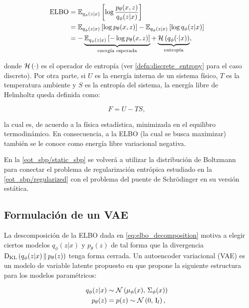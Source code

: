\begin{align*}
    \operatorname{ELBO} & = \mathbb{E}_{q_\phi(z|x)}\left[\log\frac{p_\theta(x,z)}{q_\phi(z|x)}\right]                                                                                   \\
          & = \mathbb{E}_{q_\phi(z|x)}\left[\log p_\theta(x,z)\right] - \mathbb{E}_{q_\phi(z|x)}\left[\log q_\phi(z|x)\right]                                                                  \\
          & = -\underbrace{\mathbb{E}_{q_\phi(z|x)}\left[-\log p_\theta(x,z)\right]}_{\text{energía esperada}} + \underbrace{\mathcal{H}\left(q_\phi(\cdot|x)\right)}_{\text{entropía}},
\end{align*}

donde $\mathcal{H}\left(\cdot\right)$ es el operador de entropía (ver \autoref{defn:discrete_entropy} para el caso discreto). Por otra parte, si $U$ es la energía interna de un sistema físico, $T$ es la temperatura ambiente y $S$ es la entropía del sistema, la energía libre de Helmholtz queda definida como:

\begin{equation*}
    F = U-TS,
\end{equation*}

la cual es, de acuerdo a la física estadística, minimizada en el equilibro termodinámico. En consecuencia, a la ELBO (la cual se busca maximizar) también se le conoce como energía libre variacional negativa.

En la \autoref{eot_sbp/static_sbp} se volverá a utilizar la distribución de Boltzmann para conectar el problema de regularización entrópica estudiado en la \autoref{eot_sbp/regularized} con el problema del puente de Schrödinger en su versión estática.

\subsection{Formulación de un VAE}
\label{dm/vae/formulation}

La descomposición de la ELBO dada en \eqref{eq:elbo_decomposition} motiva a elegir ciertos modelos $q_\phi(z|x)$ y $p_\theta(z)$ de tal forma que la divergencia $\operatorname{D_{KL}}\left(q_\phi(z|x)\,\|\,p_\theta(z)\right)$ tenga forma cerrada. Un autoencoder variacional (VAE) es un modelo de variable latente propuesto en \cite{kingma2022autoencoding} que propone la siguiente estructura para los modelos paramétricos:

\begin{align}
    q_\phi(z|x) & \sim \mathcal{N}\left(\mu_\phi(x),\,\Sigma_\phi(x)\right) \label{eq:vae_model_posterior} \\
    p_\theta(z) & = p(z) \sim \mathcal{N}\left(0,\,\operatorname{I}_{l}\right) \label{eq:vae_model_prior},
\end{align}

